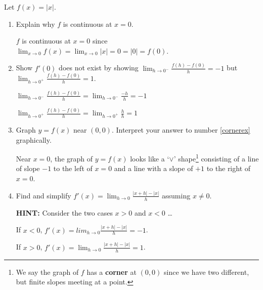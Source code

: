 \documentclass{ximera}
\begin{document}
\begin{problem} Let  $f(x) =|x|$.  

\begin{enumerate}

\item  Explain why $f$ is continuous at $x = 0$.

\begin{solution}
$f$ is continuous at $x=0$ since $\lim_{x \rightarrow 0} f(x) = \lim_{x \rightarrow 0} |x| = 0 = |0| = f(0)$.
\end{solution}

\item\label{cornerex} Show $f'(0)$ does not exist by showing $\lim_{h \rightarrow 0^{-}} \frac{f(h) - f(0)}{h} =-1$ but  $\lim_{h \rightarrow 0^{+}} \frac{f(h) - f(0)}{h} = 1$.  

\begin{solution}

 $\lim_{h \rightarrow 0^{-}} \frac{f(h) - f(0)}{h} = \lim_{h \rightarrow 0^{-}} \frac{-h}{h}  =-1$

$\lim_{h \rightarrow 0^{+}} \frac{f(h) - f(0)}{h} = \lim_{h \rightarrow 0^{+}} \frac{h}{h}  = 1$
\end{solution}
        
\item  Graph $y = f(x)$ near $(0,0)$.  Interpret your answer to number \ref{cornerex} graphically.

\begin{solution}
 Near $x = 0$, the graph of $y = f(x)$ looks like a `$\vee$' shape\footnote{We say the graph of $f$ has a  \textbf{corner} at $(0,0)$ since we have two different, but finite slopes meeting at a point.} consisting of a line of slope $-1$ to the left of $x=0$ and a line with a slope of $+1$ to the right of $x = 0$.
\end{solution}

\item  Find and simplify  $f'(x) =  \lim_{h \rightarrow 0} \frac{|x+h| - |x|}{h}$ assuming $x \neq 0$.

\textbf{HINT:}  Consider the two cases $x > 0$ and $x < 0$ \ldots

 \begin{solution}
If $x<0$, $f'(x) =  lim_{h \rightarrow 0} \frac{|x+h| - |x|}{h} = -1$.

If $x>0$, $f'(x) =  \lim_{h \rightarrow 0} \frac{|x+h| - |x|}{h} = 1$.
 \end{solution}


\end{enumerate}

\end{problem}
\end{document}
